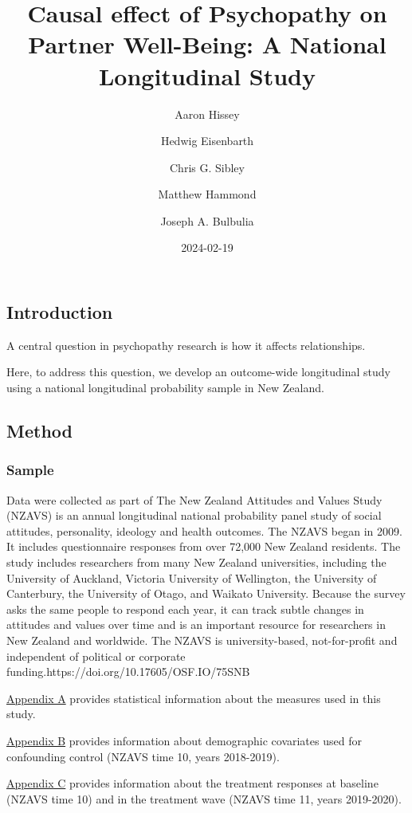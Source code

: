 \documentclass[
  singlecolumn]{article}
\title{Causal effect of Psychopathy on Partner Well-Being: A National
Longitudinal Study}
\author{Aaron Hissey \and Hedwig Eisenbarth \and Chris G.
Sibley \and Matthew Hammond \and Joseph A. Bulbulia}
\date{2024-02-19}
\begin{document}
\maketitle

\subsection{Introduction}\label{introduction}

A central question in psychopathy research is how it affects
relationships.

Here, to address this question, we develop an outcome-wide longitudinal
study using a national longitudinal probability sample in New Zealand.

\subsection{Method}\label{method}

\subsubsection{Sample}\label{sample}

Data were collected as part of The New Zealand Attitudes and Values
Study (NZAVS) is an annual longitudinal national probability panel study
of social attitudes, personality, ideology and health outcomes. The
NZAVS began in 2009. It includes questionnaire responses from over
72,000 New Zealand residents. The study includes researchers from many
New Zealand universities, including the University of Auckland, Victoria
University of Wellington, the University of Canterbury, the University
of Otago, and Waikato University. Because the survey asks the same
people to respond each year, it can track subtle changes in attitudes
and values over time and is an important resource for researchers in New
Zealand and worldwide. The NZAVS is university-based, not-for-profit and
independent of political or corporate
funding.https://doi.org/10.17605/OSF.IO/75SNB

\hyperref[appendix-measures]{Appendix A} provides statistical
information about the measures used in this study.

\hyperref[appendix-demographics]{Appendix B} provides information about
demographic covariates used for confounding control (NZAVS time 10,
years 2018-2019).

\hyperref[appendix-exposures]{Appendix C} provides information about the
treatment responses at baseline (NZAVS time 10) and in the treatment
wave (NZAVS time 11, years 2019-2020).
\end{document}
